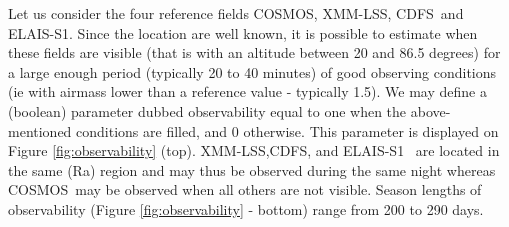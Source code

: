 \documentclass [11pt,a4paper]{article}
\newcommand{\cosmos}{COSMOS}
\newcommand{\xmmlss}{XMM-LSS}
\newcommand{\cdfs}{CDFS}
\newcommand{\elais}{ELAIS-S1}
\begin{document}
Let us consider the four reference fields \cosmos, \xmmlss, \cdfs~and \elais. Since the location are well known, it is possible to estimate when these fields are visible (that is with an altitude between 20 and 86.5 degrees) for a large enough period (typically 20 to 40 minutes) of good observing conditions (ie with airmass lower than a reference value - typically 1.5). We may define a (boolean) parameter dubbed observability equal to one when the above-mentioned conditions are filled, and 0 otherwise. This parameter is displayed on Figure \ref{fig:observability} (top). \xmmlss,\cdfs, and \elais~ are located in the same (Ra) region and may thus be observed during the same night whereas \cosmos~may be observed when all others are not visible. Season lengths of observability (Figure \ref{fig:observability} - bottom) range from 200 to 290 days.
\end{document}
